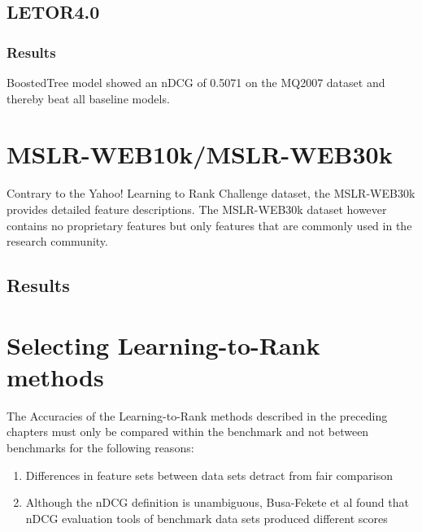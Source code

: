\section{LETOR4.0}
\subsection{Results}
BoostedTree model \cite{Kocsis2013} showed an \ac{nDCG} of 0.5071 on the MQ2007 dataset and thereby beat all baseline models.

\chapter{MSLR-WEB10k/MSLR-WEB30k}
Contrary to the Yahoo! Learning to Rank Challenge dataset, the MSLR-WEB30k provides detailed feature descriptions. The MSLR-WEB30k dataset however contains no proprietary features but only features that are commonly used in the research community.
\section{Results}

\chapter{Selecting Learning-to-Rank methods}
The Accuracies of the Learning-to-Rank methods described in the preceding chapters must only be compared within the benchmark and not between benchmarks for the following reasons:
\begin{enumerate}
\item Differences in feature sets between data sets detract from fair comparison
\item Although the \ac{nDCG} definition is unambiguous, Busa-Fekete et al \cite{Busa-Fekete2012} found that \ac{nDCG} evaluation tools of benchmark data sets produced different scores
\end{enumerate}